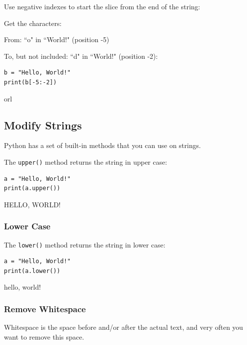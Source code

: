 \documentclass[12pt,a4paper]{article}
\newcommand{\code}[1]{%
	\colorbox{backcolour}{\lstinline{#1}}%
}
\begin{document}
Use negative indexes to start the slice from the end of the string:

\begin{ebox}{%

Get the characters:

\hspace{5mm}
From: ``o" in ``World!" (position -5)

\hspace{5mm}
To, but not included: ``d" in ``World!" (position -2):
}
	\begin{lstlisting}
b = "Hello, World!"
print(b[-5:-2])
	\end{lstlisting}
\tcblower
	\begin{vercode}
orl
	\end{vercode}
\end{ebox}
\subsection{Modify Strings}

Python has a set of built-in methods that you can use on strings.

\begin{ebox}
The \code{upper()} method returns the string in upper case:

	\begin{lstlisting}
a = "Hello, World!"
print(a.upper())
	\end{lstlisting}
\tcblower
	\begin{vercode}
HELLO, WORLD!
	\end{vercode}
\end{ebox}
\subsubsection{Lower Case}
\begin{ebox}
The \code{lower()} method returns the string in lower case:

	\begin{lstlisting}
a = "Hello, World!"
print(a.lower())
	\end{lstlisting}
\tcblower
	\begin{vercode}
hello, world!
	\end{vercode}
\end{ebox}
\subsubsection{Remove Whitespace}
Whitespace is the space before and/or after the actual text, and very often you
want to remove this space.
\end{document}
